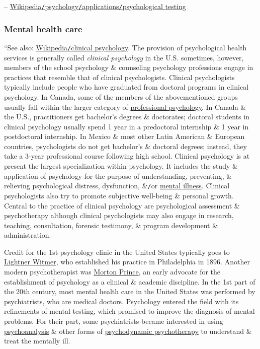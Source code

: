 \documentclass[oneside]{book}
\numberwithin{equation}{section}
\begin{document}
-- \href{https://en.wikipedia.org/wiki/Psychology#Psychological_testing}{Wikipedia\texttt{/}psychology\texttt{/}applications\texttt{/}psychological testing}

\subsubsection{Mental health care}
``See also: \href{https://en.wikipedia.org/wiki/Clinical_psychology}{Wikipedia\texttt{/}clinical psychology}. The provision of psychological health services is generally called \textit{clinical psychology} in the U.S. sometimes, however, members of the school psychology \& counseling psychology professions engage in practices that resemble that of clinical psychologists. Clinical psychologists typically include people who have graduated from doctoral programs in clinical psychology. In Canada, some of the members of the abovementioned groups usually fall within the larger category of \href{https://en.wikipedia.org/wiki/Professional_psychology}{professional psychology}. In Canada \& the U.S., practitioners get bachelor's degrees \& doctorates; doctoral students in clinical psychology usually spend 1 year in a predoctoral internship \& 1 year in postdoctoral internship. In Mexico \& most other Latin American \& European countries, psychologists do not get bachelor's \& doctoral degrees; instead, they take a 3-year professional course following high school. Clinical psychology is at present the largest specialization within psychology. It includes the study \& application of psychology for the purpose of understanding, preventing, \& relieving psychological distress, dysfunction, \&\texttt{/}or \href{https://en.wikipedia.org/wiki/Mental_illness}{mental illness}. Clinical psychologists also try to promote subjective well-being \& personal growth. Central to the practice of clinical psychology are psychological assessment \& psychotherapy although clinical psychologists may also engage in research, teaching, consultation, forensic testimony, \& program development \& administration.

Credit for the 1st psychology clinic in the United States typically goes to \href{https://en.wikipedia.org/wiki/Lightner_Witmer}{Lightner Witmer}, who established his practice in Philadelphia in 1896. Another modern psychotherapist was \href{https://en.wikipedia.org/wiki/Morton_Prince}{Morton Prince}, an early advocate for the establishment of psychology as a clinical \& academic discipline. In the 1st part of the 20th century, most mental health care in the United States was performed by psychiatrists, who are medical doctors. Psychology entered the field with its refinements of mental testing, which promised to improve the diagnosis of mental problems. For their part, some psychiatrists became interested in using \href{https://en.wikipedia.org/wiki/Psychoanalysis}{psychoanalysis} \& other forms of \href{https://en.wikipedia.org/wiki/Psychodynamic_psychotherapy}{psychodynamic psychotherapy} to understand \& treat the mentally ill.
\end{document}
